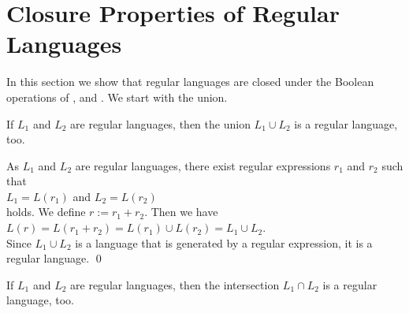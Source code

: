 \section{Closure Properties of Regular Languages}
In this section we show that regular languages are closed under the Boolean operations
of ,  and .  We start with the union.

\begin{Proposition} \label{prop:13}
  If $L_1$ and $L_2$ are regular languages, then the union $L_1 \cup L_2$ is a regular language, too.
\end{Proposition}

\proofEng
As $L_1$ and $L_2$ are regular languages, there exist regular expressions $r_1$ and $r_2$ such that
\\[0.2cm]
\hspace*{1.3cm}
$L_1 = L(r_1)$ \quad and \quad $L_2 = L(r_2)$
\\[0.2cm]
holds.  We define $r := r_1 + r_2$.  Then we have
\\[0.2cm]
\hspace*{1.3cm}
$L(r) = L(r_1 + r_2) = L(r_1) \cup L(r_2) = L_1 \cup L_2$.
\\[0.2cm]
Since $L_1 \cup L_2$ is a language that is generated by a regular expression, it is a regular language.
\qed  

\begin{Proposition} \label{satz:schnitt}
  If  $L_1$ and $L_2$ are regular languages, then the intersection $L_1 \cap L_2$ is a regular language, too.
\end{Proposition}


